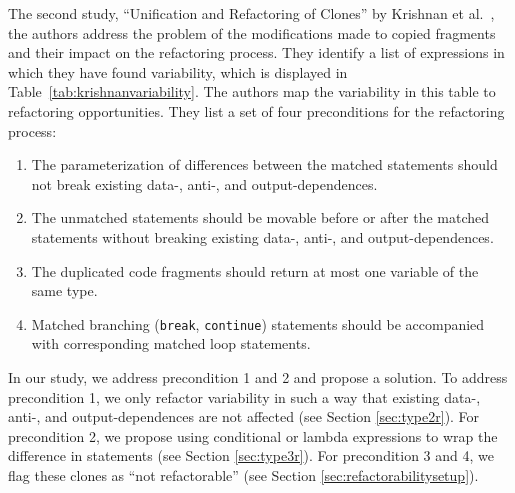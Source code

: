 The second study, ``Unification and Refactoring of Clones'' by Krishnan et %
al.~\cite{krishnan2014unification}, the authors address the problem of the modifications made to copied fragments and their impact on the refactoring process. They identify a list of expressions in which they have found variability, which is displayed in Table~\ref{tab:krishnanvariability}. The authors map the variability in this table to refactoring opportunities. They list a set of four preconditions for the refactoring process:
\begin{enumerate}
  \item The parameterization of differences between the matched statements should not break existing data-, anti-, and output-dependences.
  \item The unmatched statements should be movable before or after the matched statements without breaking existing data-, anti-, and output-dependences.
  \item The duplicated code fragments should return at most one variable of the same type.
  \item Matched branching (\texttt{break}, \texttt{continue}) statements should be accompanied with corresponding matched loop statements.
\end{enumerate}
In our study, we address precondition 1 and 2 and propose a solution. To address precondition 1, we only refactor variability in such a way that existing data-, anti-, and output-dependences are not affected (see Section \ref{sec:type2r}). For precondition 2, we propose using conditional or lambda expressions to wrap the difference in statements (see Section \ref{sec:type3r}). For precondition 3 and 4, we flag these clones as ``not refactorable'' (see Section \ref{sec:refactorabilitysetup}).

